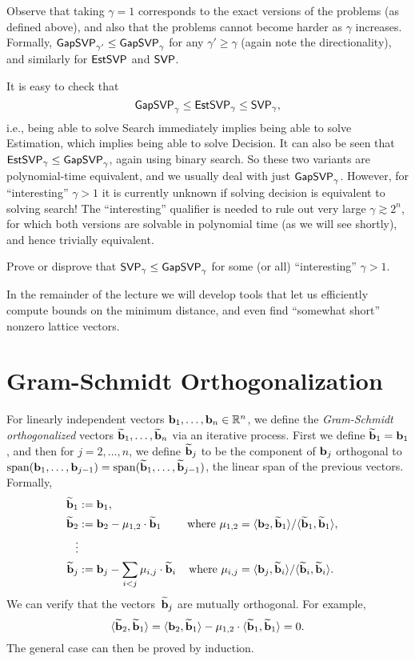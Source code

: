 \documentclass[11pt]{article}
\begin{document}
Observe that taking $\gamma=1$ corresponds to the exact versions of
the problems (as defined above), and also that the problems cannot
become harder as $\gamma$ increases. Formally,
$\mathsf{GapSVP}_{\gamma'} \leq \mathsf{GapSVP}_{\gamma}$ for any
$\gamma' \geq \gamma$ (again note the directionality), and similarly
for $\mathsf{EstSVP}$ and $\mathsf{SVP}$.

It is easy to check that
\[ \mathsf{GapSVP}_{\gamma} \leq \mathsf{EstSVP}_{\gamma} \leq \mathsf{SVP}_{\gamma}, \] i.e.,
being able to solve Search immediately implies being able to solve
Estimation, which implies being able to solve Decision. It can also be
seen that $\mathsf{EstSVP}_{\gamma} \leq \mathsf{GapSVP}_{\gamma}$, again using binary
search. So these two variants are polynomial-time equivalent, and we
usually deal with just $\mathsf{GapSVP}_{\gamma}$. However, for
``interesting'' $\gamma > 1$ it is currently unknown if solving
decision is equivalent to solving search! The ``interesting''
qualifier is needed to rule out very large $\gamma \gtrsim 2^{n}$, for
which both versions are solvable in polynomial time (as we will see
shortly), and hence trivially equivalent.

\begin{openproblem}
  \label{open:svp-search-decision}
  Prove or disprove that $\mathsf{SVP}_{\gamma} \leq \mathsf{GapSVP}_{\gamma}$ for
  some (or all) ``interesting'' $\gamma > 1$.
\end{openproblem}

In the remainder of the lecture we will develop tools that let us
efficiently compute bounds on the minimum distance, and even find
``somewhat short'' nonzero lattice vectors.

\section{Gram-Schmidt Orthogonalization}

For linearly independent vectors $\mathbf{b}_1, \ldots, \mathbf{b}_n \in \mathbb{R}^n$,
we define the \emph{Gram-Schmidt orthogonalized} vectors
$\widetilde{\mathbf{b}}_1, \ldots, \widetilde{\mathbf{b}}_n$ via an iterative process. First
we define $\widetilde{\mathbf{b}}_{1} = \mathbf{b}_{1}$, and then for $j=2,\ldots,n$,
we define $\widetilde{\mathbf{b}}_{j}$ to be the component of $\mathbf{b}_{j}$
orthogonal to
$\operatorname{span}(\mathbf{b}_{1}, \ldots, \mathbf{b}_{j-1}) = \operatorname{span}(\widetilde{\mathbf{b}}_{1}, \ldots,
\widetilde{\mathbf{b}}_{j-1})$, the linear span of the previous vectors.
Formally,
\begin{align*}
  \widetilde{\mathbf{b}}_1 &:= \mathbf{b}_1, \\
  \widetilde{\mathbf{b}}_2 &:= \mathbf{b}_2 - \mu_{1,2} \cdot \widetilde{\mathbf{b}}_1
               & \text{where } \mu_{1,2}
               &= \langle\mathbf{b}_2,\widetilde{\mathbf{b}}_1\rangle/\langle\widetilde{\mathbf{b}}_1,\widetilde{\mathbf{b}}_1\rangle, \\
  \vdots \\
  \widetilde{\mathbf{b}}_j &:= \mathbf{b}_j - \sum_{i < j} \mu_{i,j} \cdot \widetilde{\mathbf{b}}_i
               & \text{where } \mu_{i,j}
               &= \langle\mathbf{b}_j,\widetilde{\mathbf{b}}_i\rangle/\langle\widetilde{\mathbf{b}}_i,\widetilde{\mathbf{b}}_i\rangle.
\end{align*}
We can verify that the vectors~$\widetilde{\mathbf{b}}_{j}$ are mutually
orthogonal. For example,
\[ \langle\widetilde{\mathbf{b}}_{2}, \widetilde{\mathbf{b}}_{1}\rangle = \langle\mathbf{b}_{2},
    \widetilde{\mathbf{b}}_{1}\rangle - \mu_{1,2} \cdot \langle\widetilde{\mathbf{b}}_{1},
    \widetilde{\mathbf{b}}_{1}\rangle = 0. \] The general case can then be proved by
induction.
\end{document}
